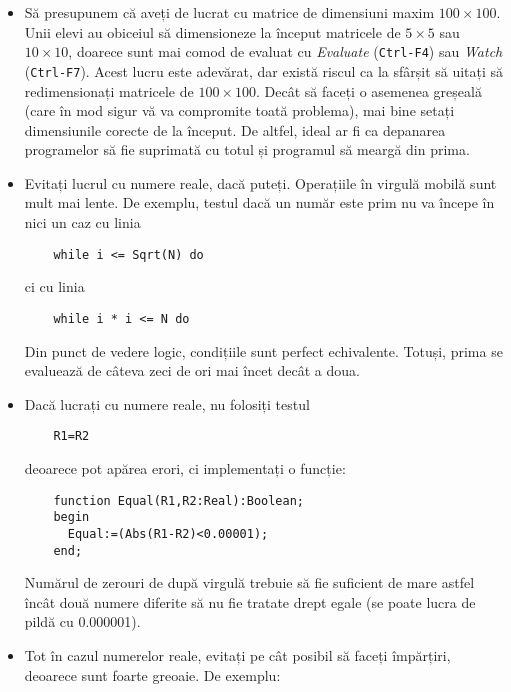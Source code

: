 \begin{itemize}
\item Să presupunem că aveți de lucrat cu matrice de dimensiuni maxim $100
  \times 100$. Unii elevi au obiceiul să dimensioneze la început matricele de
  $5 \times 5$ sau $10 \times 10$, doarece sunt mai comod de evaluat cu {\it
    Evaluate} ({\tt Ctrl-F4}) sau {\it Watch} ({\tt Ctrl-F7}). Acest lucru
  este adevărat, dar există riscul ca la sfârșit să uitați să redimensionați
  matricele de $100 \times 100$. Decât să faceți o asemenea greșeală (care în
  mod sigur vă va compromite toată problema), mai bine setați dimensiunile
  corecte de la început. De altfel, ideal ar fi ca depanarea programelor să
  fie suprimată cu totul și programul să meargă din prima.
  
\item Evitați lucrul cu numere reale, dacă puteți. Operațiile în virgulă
  mobilă sunt mult mai lente. De exemplu, testul dacă un număr este prim nu va
  începe în nici un caz cu linia

  \begin{verbatim}
    while i <= Sqrt(N) do
  \end{verbatim}

  ci cu linia

  \begin{verbatim}
    while i * i <= N do
  \end{verbatim}

  Din punct de vedere logic, condițiile sunt perfect echivalente. Totuși,
  prima se evaluează de câteva zeci de ori mai încet decât a doua.

\item Dacă lucrați cu numere reale, nu folosiți testul

  \begin{verbatim}
    R1=R2
  \end{verbatim}

  deoarece pot apărea erori, ci implementați o funcție:

  \begin{verbatim}
    function Equal(R1,R2:Real):Boolean;
    begin
      Equal:=(Abs(R1-R2)<0.00001);
    end;
  \end{verbatim}

  Numărul de zerouri de după virgulă trebuie să fie suficient de mare astfel
  încât două numere diferite să nu fie tratate drept egale (se poate lucra de
  pildă cu 0.000001).

\item Tot în cazul numerelor reale, evitați pe cât posibil să faceți
  împărțiri, deoarece sunt foarte greoaie. De exemplu:


\end{itemize}
